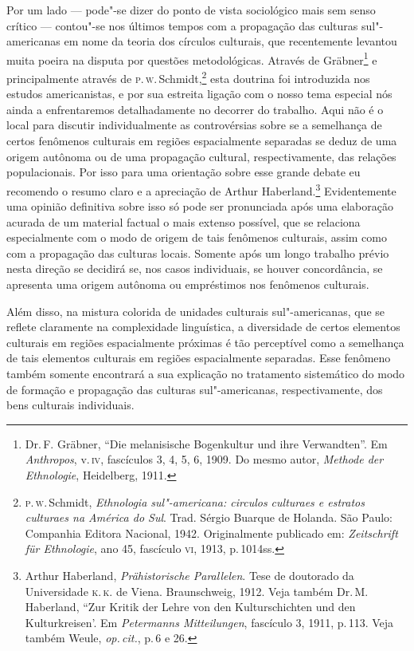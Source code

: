 Por um lado --- pode"-se dizer do ponto de vista sociológico mais sem
senso crítico --- contou"-se nos últimos tempos com a propagação das
culturas sul"-americanas em nome da teoria dos círculos culturais, que recentemente levantou muita poeira na
disputa por questões metodológicas. Através de Gräbner\footnote{Dr.\,F. Gräbner,
  ``Die melanisische Bogenkultur und ihre Verwandten''. Em \textit{Anthropos}, v.\,\textsc{iv}, fascículos 3, 4, 5, 6, 1909. Do mesmo autor, \textit{Methode der
  Ethnologie}, Heidelberg, 1911.} e %
principalmente através de \textsc{p}.\,\textsc{w}.\,Schmidt,\footnote{\textsc{p.\,w}.\,Schmidt, \textit{Ethnologia sul"-americana: circulos
  culturaes e estratos culturaes na América do Sul}. Trad. Sérgio Buarque de Holanda. São Paulo: Companhia Editora Nacional, 1942. Originalmente publicado em:
  \textit{Zeitschrift für Ethnologie}, ano 45, fascículo \textsc{vi}, 1913, p.\,1014ss.} esta doutrina foi introduzida nos estudos
americanistas, e por sua estreita ligação com o nosso tema especial nós
ainda a enfrentaremos detalhadamente no decorrer do trabalho. Aqui não é
o local para discutir individualmente as controvérsias sobre se a
semelhança de certos fenômenos culturais em regiões espacialmente
separadas se deduz de uma origem autônoma ou de uma propagação
cultural, respectivamente, das relações populacionais. Por isso para uma
orientação sobre esse grande debate eu recomendo o resumo claro e a
apreciação de Arthur Haberland.\footnote{Arthur Haberland,
  \textit{Prähistorische Parallelen}. Tese
  de doutorado da Universidade \textsc{k.\,k.} de Viena. Braunschweig, 1912. Veja
  também Dr.\,M. Haberland, ``Zur Kritik der Lehre von den
  Kulturschichten und den Kulturkreisen'. Em
  \textit{Petermanns Mitteilungen}, fascículo 3, 1911, p.\,113. Veja
  também Weule, \textit{op.\,cit.}, p.\,6 e 26.} Evidentemente uma opinião
definitiva sobre isso só pode ser pronunciada após uma elaboração
acurada de um material factual o mais extenso possível, que se
relaciona especialmente com o modo de origem de tais fenômenos
culturais, assim como com a propagação das culturas locais. Somente após
um longo trabalho prévio nesta direção se decidirá se, nos casos
individuais, se houver concordância, se apresenta uma origem autônoma ou
empréstimos nos fenômenos culturais.

Além disso, na mistura colorida de unidades culturais sul"-americanas,
que se reflete claramente na complexidade linguística, a diversidade de
certos elementos culturais em regiões espacialmente próximas é tão
perceptível como a semelhança de tais elementos culturais em regiões
espacialmente separadas. Esse fenômeno também somente encontrará a sua
explicação no tratamento sistemático do modo de formação e propagação
das culturas sul"-americanas, respectivamente, dos bens culturais
individuais.

